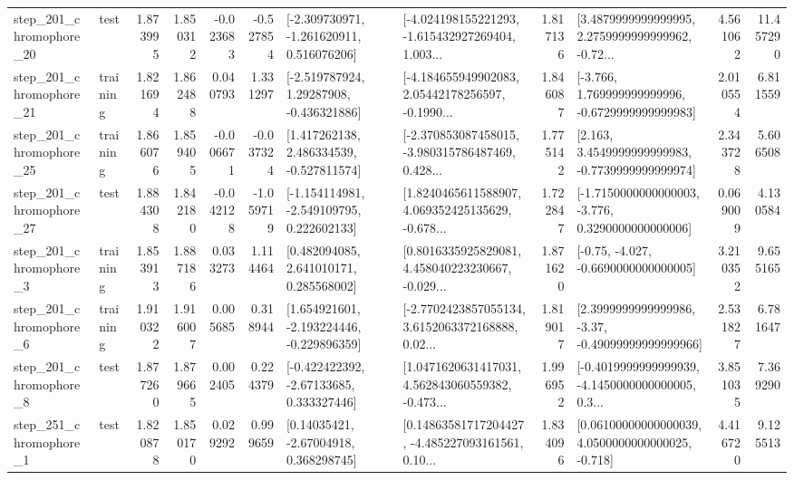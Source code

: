 \begin{tabular}{llrrrrllrlrr}
  step\_201\_chromophore\_20 &      test &      1.873995 &    1.850312 &     -0.023683 & -0.527854 &   [-2.309730971, -1.261620911, 0.516076206] &  [-4.024198155221293, -1.615432927269404, 1.003... &       1.817136 &  [3.4879999999999995, 2.2759999999999962, -0.72... &            4.561062 &         11.457290 \\
  step\_201\_chromophore\_21 &  training &      1.821694 &    1.862488 &      0.040793 &  1.331297 &    [-2.519787924, 1.29287908, -0.436321886] &  [-4.184655949902083, 2.05442178256597, -0.1990... &       1.846087 &   [-3.766, 1.769999999999996, -0.6729999999999983] &            2.010554 &          6.811559 \\
  step\_201\_chromophore\_25 &  training &      1.866076 &    1.859405 &     -0.006671 & -0.037324 &    [1.417262138, 2.486334539, -0.527811574] &  [-2.370853087458015, -3.980315786487469, 0.428... &       1.775142 &   [2.163, 3.4549999999999983, -0.7739999999999974] &            2.343728 &          5.606508 \\
  step\_201\_chromophore\_27 &      test &      1.884308 &    1.842180 &     -0.042128 & -1.059719 &   [-1.154114981, -2.549109795, 0.222602133] &  [1.8240465611588907, 4.069352425135629, -0.678... &       1.722847 &  [-1.7150000000000003, -3.776, 0.3290000000000006] &            0.069009 &          4.130584 \\
   step\_201\_chromophore\_3 &  training &      1.853913 &    1.887186 &      0.033273 &  1.114464 &     [0.482094085, 2.641010171, 0.285568002] &  [0.8016335925829081, 4.458040223230667, -0.029... &       1.871620 &               [-0.75, -4.027, -0.6690000000000005] &            3.210352 &          9.655165 \\
   step\_201\_chromophore\_6 &  training &      1.910322 &    1.916007 &      0.005685 &  0.318944 &   [1.654921601, -2.193224446, -0.229896359] &  [-2.7702423857055134, 3.6152063372168888, 0.02... &       1.819017 &  [2.3999999999999986, -3.37, -0.49099999999999966] &            2.531827 &          6.781647 \\
   step\_201\_chromophore\_8 &      test &      1.877260 &    1.879665 &      0.002405 &  0.224379 &    [-0.422422392, -2.67133685, 0.333327446] &  [1.0471620631417031, 4.562843060559382, -0.473... &       1.996952 &  [-0.4019999999999939, -4.1450000000000005, 0.3... &            3.851035 &          7.369290 \\
   step\_251\_chromophore\_1 &      test &      1.820878 &    1.850170 &      0.029292 &  0.999659 &      [0.14035421, -2.67004918, 0.368298745] &  [0.14863581717204427, -4.485227093161561, 0.10... &       1.834096 &  [0.06100000000000039, 4.0500000000000025, -0.718] &            4.416720 &          9.125513 \\

\end{tabular}
